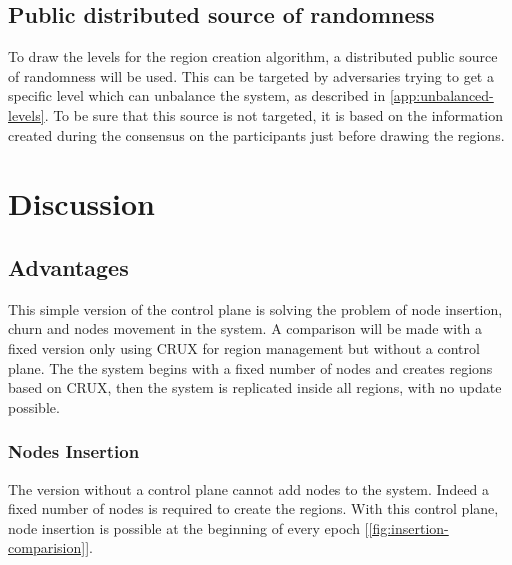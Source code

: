 \documentclass[a4paper,11pt,oneside]{report}
\begin{document}
\subsection{Public distributed source of randomness}
To draw the levels for the region creation algorithm, a distributed public
source of randomness will be used. This can be targeted by adversaries trying
to get a specific level which can unbalance the system, as described in
\autoref{app:unbalanced-levels}. To be sure that this source is not targeted,
it is based on the information created during the consensus on the participants
just before drawing the regions. 

\FloatBarrier
\section{Discussion}
\subsection{Advantages}
This simple version of the control plane is solving the problem of node
insertion, churn and nodes movement in the system. A comparison will be made
with a fixed version only using CRUX for region management but without a
control plane. The the system begins with a fixed number of nodes and creates
regions based on CRUX, then the system is replicated inside all regions, with
no update possible.

\subsubsection{Nodes Insertion}
The version without a control plane cannot add nodes to the system. Indeed a
fixed number of nodes is required to create the regions. With this control
plane, node insertion is possible at the beginning of every epoch
[\autoref{fig:insertion-comparision}].
\end{document}
